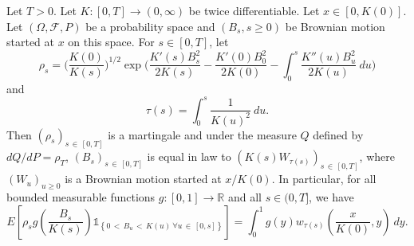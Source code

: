 \documentclass[AHL,Unicode,longabstracts,published]{cedram}
\newcommand\F{\mathcal{F}}
\newcommand*\R{\mathbb{R}}
\newcommand{\1} {\mathds{1}}
\let\oldforall\forall
\renewcommand*{\forall}{\mathrel{\oldforall}}
\begin{document}
\begin{lemm}\label{densityK}
Let $T > 0$. Let $K: [0, T] \rightarrow (0, \infty)$ be twice differentiable. Let $x\in [0,K(0)]$. Let $(\Omega, \F, P)$ be a probability space and $(B_s, s \geq 0)$ be Brownian motion started at $x$ on this space. For $s \in [0, T]$, let
\begin{equation}\label{rhodef}
\rho_s = \bigg(\frac{K(0)}{K(s)} \bigg)^{1/2} \exp \bigg(\frac{K'(s) B_s^2}{2K(s)} - \frac{K'(0)B_0^2}{2K(0)} - \int_0^s \frac{K''(u)B_u^2}{2K(u)} \: du \bigg)
\end{equation}
and
\begin{equation}\label{taudef}
\tau(s) = \int_0^s \frac{1}{K(u)^2} \: du.
\end{equation}
Then $(\rho_s)_{s\,\in\,[0,T]}$ is a martingale and under the measure $Q$ defined by $dQ/dP = \rho_T$, $(B_s)_{s\,\in\,[0,T]}$ is equal in law to $(K(s) W_{\tau(s)})_{s\,\in\,[0,T]}$, where $(W_u)_{u\ge0}$ is a Brownian motion started at $x/K(0)$. In particular, for all bounded measurable functions $g: [0, 1] \rightarrow \R$ and all $s \in (0, T]$, we have
\[
E \left[\rho_s g \left(\frac{B_s}{K(s)} \right) \1_{\left\{0\,<\,B_u\,<\,K(u) \: \forall u\,\in\,[0, s]\right\}} \right] = \int_0^1 g(y) w_{\tau(s)}\left(\frac x {K(0)}, y\right) \: dy.
\]
\end{lemm}
\end{document}

